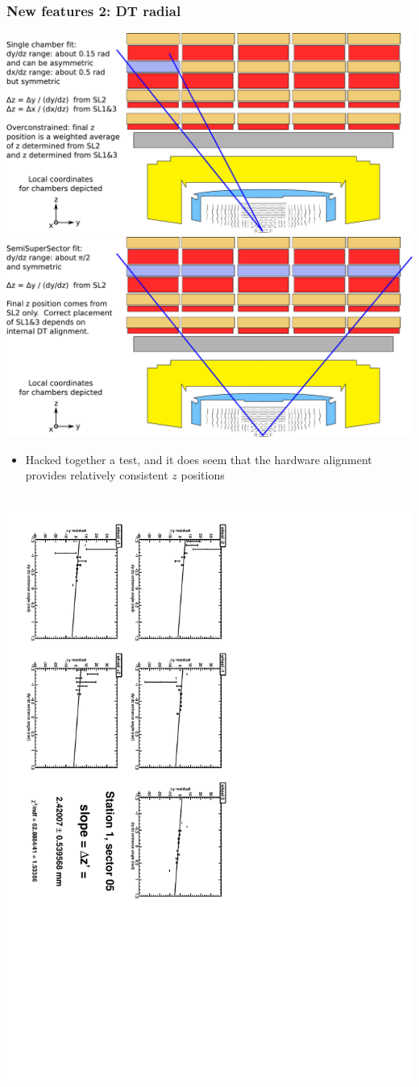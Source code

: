 \documentclass[compress]{beamer}
\begin{document}
\begin{frame}
\frametitle{New features 2: DT radial}
\includegraphics[width=0.5\linewidth]{zfits_normal.pdf}\includegraphics[width=0.5\linewidth]{zfits_alternative.pdf}

\begin{itemize}
\item Hacked together a test, and it does seem that the hardware alignment provides relatively consistent $z$ positions
\end{itemize}

\begin{columns}
\includegraphics[height=\linewidth, angle=90]{zfit_1_05.pdf}


\end{columns}
\end{frame}
\end{document}
